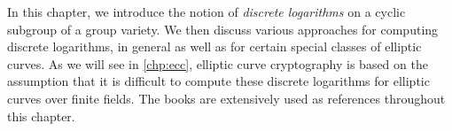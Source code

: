 

In this chapter, we introduce the notion of \emph{discrete logarithms} on a cyclic subgroup of a group variety. We then discuss various approaches for computing discrete logarithms, in general as well as for certain special classes of elliptic curves. As we will see in \cref{chp:ecc}, elliptic curve cryptography is based on the assumption that it is difficult to compute these discrete logarithms for elliptic curves over finite fields. The books \citep{Galbraith,Washington} are extensively used as references throughout this chapter.
